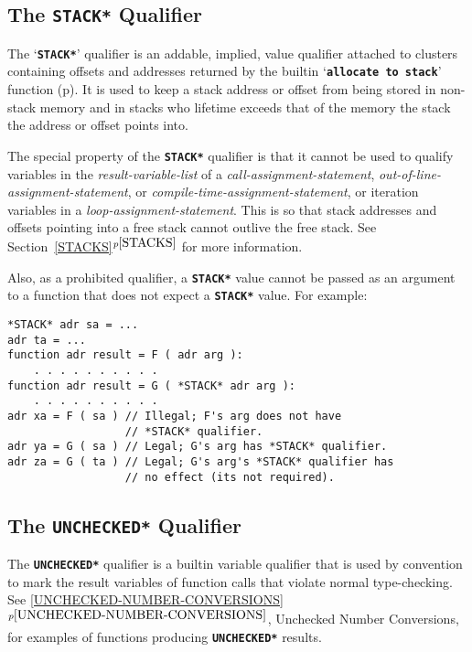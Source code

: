 \documentclass[12pt]{article}
\makeatletter
\newcommand{\TT}[1]{{\tt \bfseries #1}}
\newcommand{\ttakey}[1]{\TT{*#1*}\index{#1@{\tt *#1*}}}
\newcommand{\itemref}[1]{\ref{#1}$^{p\pageref{#1}}$}
\newcommand{\pagref}[1]{p\pageref{#1}}
\newenvironment{indpar}[1][0.3in]%
	{\begin{list}{}%
		     {\setlength{\itemsep}{0in}%
		      \setlength{\topsep}{0in}%
		      \setlength{\parsep}{1ex}%
		      \setlength{\labelwidth}{#1}%
		      \setlength{\leftmargin}{#1}%
		      \addtolength{\leftmargin}{\labelsep}}%
	 \item}%
	{\end{list}}
\makeatother
\begin{document}
\subsection{The \TT{*STACK*} Qualifier}
\label{THE-STACK-QUALIFIER}

The `\ttakey{STACK}' qualifier is an addable,
implied, value qualifier
attached to clusters containing offsets and addresses
returned by the builtin `\TT{allocate to stack}'
function (\pagref{ALLOCATE-TO-STACK}).
It is used to keep a stack address or offset from being stored in
non-stack memory and in stacks who lifetime exceeds that of the
memory the stack the address or offset points into.

The special property of the \TT{*STACK*} qualifier is that it cannot
be used to qualify variables in the {\em result-variable-list}
of a {\em call-assignment-statement},
{\em out-of-line-assignment-statement}, or
{\em compile-time-assignment-statement},
or iteration variables in a {\em loop-assignment-statement}.
This is so that stack addresses and offsets pointing into a free stack
cannot outlive the free stack.
See Section~\itemref{STACKS} for more information.

Also, as a prohibited qualifier, a \TT{*STACK*} value cannot be
passed as an argument to a function that does not expect a
\TT{*STACK*} value.  For example:
\begin{indpar}\begin{verbatim}
*STACK* adr sa = ...
adr ta = ...
function adr result = F ( adr arg ):
    . . . . . . . . . .
function adr result = G ( *STACK* adr arg ):
    . . . . . . . . . .
adr xa = F ( sa ) // Illegal; F's arg does not have
                  // *STACK* qualifier.
adr ya = G ( sa ) // Legal; G's arg has *STACK* qualifier.
adr za = G ( ta ) // Legal; G's arg's *STACK* qualifier has
                  // no effect (its not required).
\end{verbatim}\end{indpar}

\subsection{The \TT{*UNCHECKED*} Qualifier}
\label{THE-UNCHECKED-QUALIFIER}

The \ttakey{UNCHECKED} qualifier is a builtin
variable qualifier that is used by convention to mark the result variables
of function calls that violate normal type-checking.
See \itemref{UNCHECKED-NUMBER-CONVERSIONS}, Unchecked Number
Conversions, for examples of functions producing \TT{*UNCHECKED*}
results.
\end{document}

